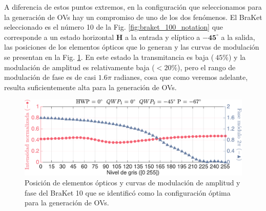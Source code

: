 A diferencia de estos puntos extremos, en la configuración que
seleccionamos para la generación de OVs hay un compromiso de uno de
los dos fenómenos. El BraKet seleccionado es el número 10 de la
Fig. \ref{fig:braket_100_notation} que corresponde a un estado
horizontal $\mathbf{H}$ a la entrada y elíptico a $\mathbf{-45^{\circ}}$ a la
salida, las posiciones de los elementos ópticos que lo generan y las
curvas de modulación se presentan en la
Fig. \ref{fig:amp_and_phase_I100}. 
En este estado la transmitancia es baja
($~45\%$) y la modulación de amplitud es relativamente baja ($<20\%$),
pero el rango de modulación de fase es de casi $1.6\pi$ radianes, cosa que como
veremos adelante, resulta suficientemente alta para la generación de
OVs. 
\begin{figure}[H]
\centering
\includegraphics[scale=0.52]{amp_and_phase_I10.pdf}
\caption[Modulación de amplitud y fase óptima]{Posición de elementos
  ópticos y curvas de modulación de amplitud y fase del BraKet 10 que
  se identificó como la configuración óptima para la generación de OVs.} 
\label{fig:amp_and_phase_I100}
\end{figure}

